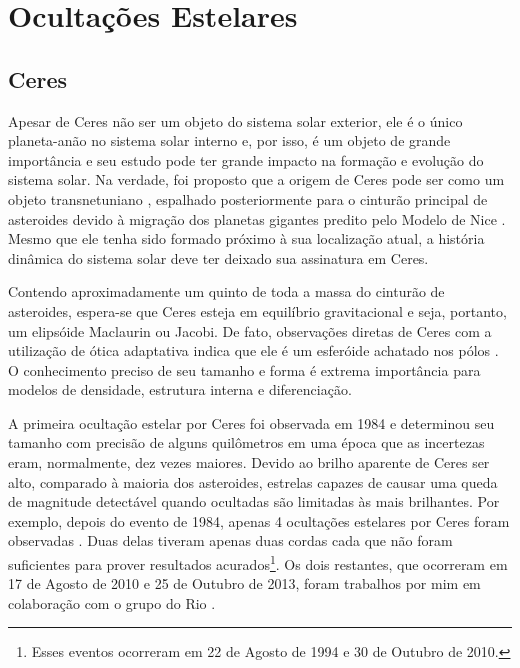 \documentclass[12pt,a4paper]{monografia}
\begin{document}
\chapter{Ocultações Estelares}
\label{Cap: observacoes}

\section{Ceres}
\label{Sec: Ceres}

\indent \indent Apesar de Ceres não ser um objeto do sistema solar exterior, ele é o único planeta-anão no sistema solar interno e, por isso, é um objeto de grande importância e seu estudo pode ter grande impacto na formação e evolução do sistema solar. Na verdade, foi proposto que a origem de Ceres pode ser como um objeto transnetuniano \citep{McKinnon2012}, espalhado posteriormente para o cinturão principal de asteroides devido à migração dos planetas gigantes predito pelo Modelo de Nice \citep{Gomes2005}. Mesmo que ele tenha sido formado próximo à sua localização atual, a história dinâmica do sistema solar deve ter deixado sua assinatura em Ceres.

Contendo aproximadamente um quinto de toda a massa do cinturão de asteroides, espera-se que Ceres esteja em equilíbrio gravitacional e seja, portanto, um elipsóide Maclaurin ou Jacobi. De fato, observações diretas de Ceres com a utilização de ótica adaptativa indica que ele é um esferóide achatado nos pólos \citep{Drummond2014}. O conhecimento preciso de seu tamanho e forma é extrema importância para modelos de densidade, estrutura interna e diferenciação.

A primeira ocultação estelar por Ceres foi observada em 1984 \citep{Millis1987} e determinou seu tamanho com precisão de alguns quilômetros em uma época que as incertezas eram, normalmente, dez vezes maiores. Devido ao brilho aparente de Ceres ser alto, comparado à maioria dos asteroides, estrelas capazes de causar uma queda de magnitude detectável quando ocultadas são limitadas às mais brilhantes. Por exemplo, depois do evento de 1984, apenas 4 ocultações estelares por Ceres foram observadas \citep{Dunham2014}. Duas delas tiveram apenas duas cordas cada que não foram suficientes para prover resultados acurados\footnote{Esses eventos ocorreram em 22 de Agosto de 1994 e 30 de Outubro de 2010.}. Os dois restantes, que ocorreram em 17 de Agosto de 2010 e 25 de Outubro de 2013, foram trabalhos por mim em colaboração com o grupo do Rio \citep[aceito]{GomesJunior2015-Ceres}.
\end{document}
